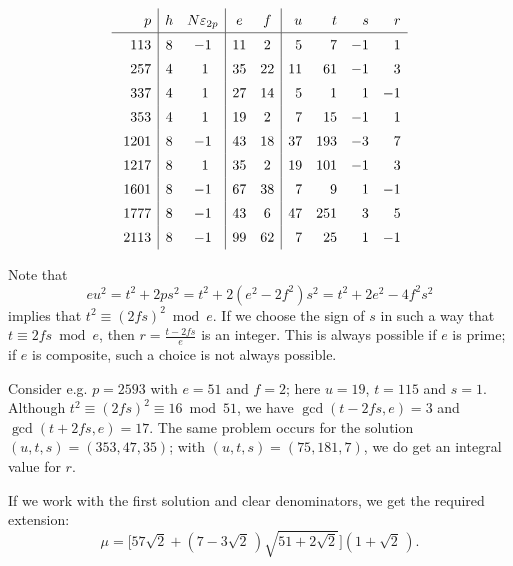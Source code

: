 \documentclass{amsart}
\newcommand{\rsp}{\raisebox{0em}[2.7ex][1.3ex]{\rule{0em}{2ex} }}
\newcommand{\Q}{{\mathbb Q}}
\newcommand{\eps}{\varepsilon}
\begin{document}
\begin{table}[ht!]
$$ \begin{array}{r|cc|cc|rrrr}
    \rsp  p  & h & N\eps_{2p} & e & f  & u & t & s & r \\ \hline
    \rsp  113 & 8 & - 1 & 11 &  2 &   5 &   7 & -1 & 1 \\
    \rsp  257 & 4 & \ 1 & 35 & 22 &  11 &  61 & -1 & 3 \\
    \rsp  337 & 4 & \ 1 & 27 & 14 &   5 &   1 &  1 & -1 \\
    \rsp  353 & 4 & \ 1 & 19 &  2 &   7 &  15 & -1 &  1 \\ 
    \rsp 1201 & 8 & - 1 & 43 & 18 &  37 & 193 & -3 &  7 \\
    \rsp 1217 & 8 & \ 1 & 35 &  2 &  19 & 101 & -1 &  3 \\
    \rsp 1601 & 8 & - 1 & 67 & 38 &   7 &   9 &  1 & -1 \\
    \rsp 1777 & 8 & - 1 & 43 &  6 &  47 & 251 &  3 &  5 \\
    \rsp 2113 & 8 &  -1 & 99 & 62 &   7 &  25 &  1 & -1
  \end{array} $$  
  \caption{Fields $\Q(\sqrt{2p}\,)$ with narrow class number divisible by $8$}
\end{table}



Note that
$$ eu^2 = t^2 + 2ps^2 = t^2 + 2(e^2 - 2f^2)s^2 = t^2 + 2e^2 - 4f^2s^2 $$
implies that $t^2 \equiv (2fs)^2 \bmod e$. 
If we choose the sign of $s$ in such a way that $t \equiv 2fs \bmod e$, 
then $r = \frac{t-2fs}{e}$ is an integer. This is always possible if $e$
is prime; if $e$ is composite, such a choice is not always possible.

Consider e.g. $p = 2593$ with $e = 51$ and $f = 2$; here $u = 19$,
$t = 115$ and $s = 1$. Although $t^2 \equiv (2fs)^2 \equiv 16 \bmod 51$,
we have $\gcd(t-2fs,e) = 3$ and $\gcd(t+2fs,e) = 17$. The same
problem occurs for the solution $(u,t,s)=(353, 47, 35)$; with
$(u,t,s)= (75, 181, 7)$, we do get an integral value for $r$.

If we work with the first solution and clear denominators, we get the
required extension:
$$ \mu = \Big[57\sqrt{2} + (7 - 3\sqrt{2}\,) \sqrt{51 + 2\sqrt{2}}\Big]
         (1+\sqrt{2}\,). $$

\bigskip
\end{document}
